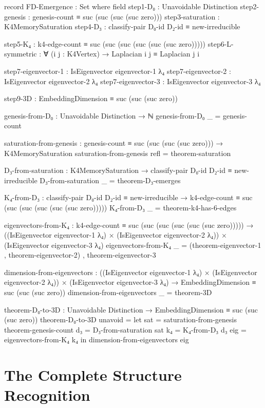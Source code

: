 \documentclass[11pt,a4paper]{book}
\begin{document}
\begin{code}
record FD-Emergence : Set where
  field
    step1-D₀          : Unavoidable Distinction
    step2-genesis     : genesis-count ≡ suc (suc (suc (suc zero)))
    step3-saturation  : K4MemorySaturation
    step4-D₃          : classify-pair D₀-id D₂-id ≡ new-irreducible
    
    step5-K₄          : k4-edge-count ≡ suc (suc (suc (suc (suc (suc zero)))))
    step6-L-symmetric : ∀ (i j : K4Vertex) → Laplacian i j ≡ Laplacian j i
    
    step7-eigenvector-1 : IsEigenvector eigenvector-1 λ₄
    step7-eigenvector-2 : IsEigenvector eigenvector-2 λ₄
    step7-eigenvector-3 : IsEigenvector eigenvector-3 λ₄
    
    step9-3D          : EmbeddingDimension ≡ suc (suc (suc zero))

genesis-from-D₀ : Unavoidable Distinction → ℕ
genesis-from-D₀ _ = genesis-count

saturation-from-genesis : genesis-count ≡ suc (suc (suc (suc zero))) → K4MemorySaturation
saturation-from-genesis refl = theorem-saturation

D₃-from-saturation : K4MemorySaturation → classify-pair D₀-id D₂-id ≡ new-irreducible
D₃-from-saturation _ = theorem-D₃-emerges

K₄-from-D₃ : classify-pair D₀-id D₂-id ≡ new-irreducible → 
             k4-edge-count ≡ suc (suc (suc (suc (suc (suc zero)))))
K₄-from-D₃ _ = theorem-k4-has-6-edges

eigenvectors-from-K₄ : k4-edge-count ≡ suc (suc (suc (suc (suc (suc zero))))) →
  ((IsEigenvector eigenvector-1 λ₄) × (IsEigenvector eigenvector-2 λ₄)) × 
  (IsEigenvector eigenvector-3 λ₄)
eigenvectors-from-K₄ _ = (theorem-eigenvector-1 , theorem-eigenvector-2) , theorem-eigenvector-3

dimension-from-eigenvectors : 
  ((IsEigenvector eigenvector-1 λ₄) × (IsEigenvector eigenvector-2 λ₄)) × 
  (IsEigenvector eigenvector-3 λ₄) → EmbeddingDimension ≡ suc (suc (suc zero))
dimension-from-eigenvectors _ = theorem-3D

theorem-D₀-to-3D : Unavoidable Distinction → EmbeddingDimension ≡ suc (suc (suc zero))
theorem-D₀-to-3D unavoid = 
  let sat = saturation-from-genesis theorem-genesis-count
      d₃  = D₃-from-saturation sat
      k₄  = K₄-from-D₃ d₃
      eig = eigenvectors-from-K₄ k₄
  in dimension-from-eigenvectors eig
\end{code}

\section{The Complete Structure Recognition}
\end{document}
